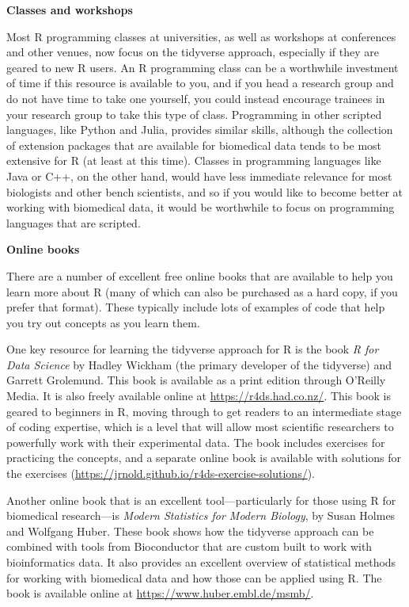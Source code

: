 \documentclass[]{tufte-book}
\begin{document}
\textbf{Classes and workshops}

Most R programming classes at universities, as well as workshops at conferences
and other venues, now focus on the tidyverse approach, especially if they are
geared to new R users. An R programming class can be a worthwhile investment of
time if this resource is available to you, and if you head a research group and
do not have time to take one yourself, you could instead encourage
trainees in your research group to take this type of class. Programming in other
scripted languages, like Python and Julia, provides similar skills, although the
collection of extension packages that are available for biomedical data tends to
be most extensive for R (at least at this time). Classes in programming
languages like Java or C++, on the other hand, would have less immediate
relevance for most biologists and other bench scientists, and so if you would
like to become better at working with biomedical data, it would be worthwhile to
focus on programming languages that are scripted.

\textbf{Online books}

There are a number of excellent free online books that are available to help
you learn more about R (many of which can also be purchased as a hard copy, if
you prefer that format). These typically include lots of examples of code that
help you try out concepts as you learn them.

One key resource for learning the tidyverse approach for R is the book \emph{R for
Data Science} by Hadley Wickham (the primary developer of the tidyverse) and
Garrett Grolemund. This book is available as a print edition through O'Reilly
Media. It is also freely available online at \url{https://r4ds.had.co.nz/}. This book
is geared to beginners in R, moving through to get readers to an intermediate
stage of coding expertise, which is a level that will allow most scientific
researchers to powerfully work with their experimental data. The book includes
exercises for practicing the concepts, and a separate online book is available
with solutions for the exercises
(\url{https://jrnold.github.io/r4ds-exercise-solutions/}).

Another online book that is an excellent tool---particularly for those using
R for biomedical research---is \emph{Modern Statistics for Modern Biology}, by
Susan Holmes and Wolfgang Huber. These book shows how the tidyverse approach
can be combined with tools from Bioconductor that are custom built to
work with bioinformatics data. It also provides an excellent overview of
statistical methods for working with biomedical data and how those can be
applied using R. The book is available online at \url{https://www.huber.embl.de/msmb/}.
\end{document}
